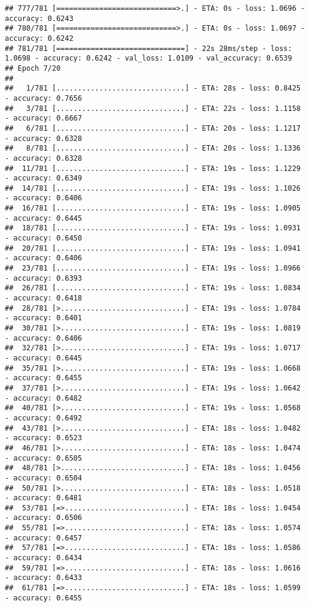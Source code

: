 \documentclass[
]{article}
\begin{document}
\begin{verbatim}
## 777/781 [============================>.] - ETA: 0s - loss: 1.0696 - accuracy: 0.6243
## 780/781 [============================>.] - ETA: 0s - loss: 1.0697 - accuracy: 0.6242
## 781/781 [==============================] - 22s 28ms/step - loss: 1.0698 - accuracy: 0.6242 - val_loss: 1.0109 - val_accuracy: 0.6539
## Epoch 7/20
## 
##   1/781 [..............................] - ETA: 28s - loss: 0.8425 - accuracy: 0.7656
##   3/781 [..............................] - ETA: 22s - loss: 1.1158 - accuracy: 0.6667
##   6/781 [..............................] - ETA: 20s - loss: 1.1217 - accuracy: 0.6328
##   8/781 [..............................] - ETA: 20s - loss: 1.1336 - accuracy: 0.6328
##  11/781 [..............................] - ETA: 19s - loss: 1.1229 - accuracy: 0.6349
##  14/781 [..............................] - ETA: 19s - loss: 1.1026 - accuracy: 0.6406
##  16/781 [..............................] - ETA: 19s - loss: 1.0905 - accuracy: 0.6445
##  18/781 [..............................] - ETA: 19s - loss: 1.0931 - accuracy: 0.6450
##  20/781 [..............................] - ETA: 19s - loss: 1.0941 - accuracy: 0.6406
##  23/781 [..............................] - ETA: 19s - loss: 1.0966 - accuracy: 0.6393
##  26/781 [..............................] - ETA: 19s - loss: 1.0834 - accuracy: 0.6418
##  28/781 [>.............................] - ETA: 19s - loss: 1.0784 - accuracy: 0.6401
##  30/781 [>.............................] - ETA: 19s - loss: 1.0819 - accuracy: 0.6406
##  32/781 [>.............................] - ETA: 19s - loss: 1.0717 - accuracy: 0.6445
##  35/781 [>.............................] - ETA: 19s - loss: 1.0668 - accuracy: 0.6455
##  37/781 [>.............................] - ETA: 19s - loss: 1.0642 - accuracy: 0.6482
##  40/781 [>.............................] - ETA: 19s - loss: 1.0568 - accuracy: 0.6492
##  43/781 [>.............................] - ETA: 18s - loss: 1.0482 - accuracy: 0.6523
##  46/781 [>.............................] - ETA: 18s - loss: 1.0474 - accuracy: 0.6505
##  48/781 [>.............................] - ETA: 18s - loss: 1.0456 - accuracy: 0.6504
##  50/781 [>.............................] - ETA: 18s - loss: 1.0518 - accuracy: 0.6481
##  53/781 [=>............................] - ETA: 18s - loss: 1.0454 - accuracy: 0.6506
##  55/781 [=>............................] - ETA: 18s - loss: 1.0574 - accuracy: 0.6457
##  57/781 [=>............................] - ETA: 18s - loss: 1.0586 - accuracy: 0.6434
##  59/781 [=>............................] - ETA: 18s - loss: 1.0616 - accuracy: 0.6433
##  61/781 [=>............................] - ETA: 18s - loss: 1.0599 - accuracy: 0.6455

\end{verbatim}
\end{document}
